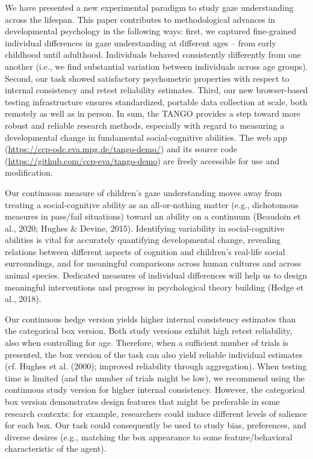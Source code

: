 \documentclass[
  man,floatsintext]{apa7}
\begin{document}
We have presented a new experimental paradigm to study gaze understanding across the lifespan.
This paper contributes to methodological advances in developmental psychology in the following ways: first, we captured fine-grained individual differences in gaze understanding at different ages -- from early childhood until adulthood.
Individuals behaved consistently differently from one another (i.e., we find substantial variation between individuals across age groups).
Second, our task showed satisfactory psychometric properties with respect to internal consistency and retest reliability estimates.
Third, our new browser-based testing infrastructure ensures standardized, portable data collection at scale, both remotely as well as in person.
In sum, the TANGO provides a step toward more robust and reliable research methods, especially with regard to measuring a developmental change in fundamental social-cognitive abilities.
The web app (\url{https://ccp-odc.eva.mpg.de/tango-demo/}) and its source code (\url{https://github.com/ccp-eva/tango-demo}) are freely accessible for use and modification.

Our continuous measure of children's gaze understanding moves away from treating a social-cognitive ability as an all-or-nothing matter (e.g., dichotomous measures in pass/fail situations) toward an ability on a continuum (Beaudoin et al., 2020; Hughes \& Devine, 2015).
Identifying variability in social-cognitive abilities is vital for accurately quantifying developmental change, revealing relations between different aspects of cognition and children's real-life social surroundings, and for meaningful comparisons across human cultures and across animal species.
Dedicated measures of individual differences will help us to design meaningful interventions and progress in psychological theory building (Hedge et al., 2018).

Our continuous hedge version yields higher internal consistency estimates than the categorical box version.
Both study versions exhibit high retest reliability, also when controlling for age.
Therefore, when a sufficient number of trials is presented, the box version of the task can also yield reliable individual estimates (cf. Hughes et al. (2000); improved reliability through aggregation).
When testing time is limited (and the number of trials might be low), we recommend using the continuous study version for higher internal consistency.
However, the categorical box version demonstrates design features that might be preferable in some research contexts: for example, researchers could induce different levels of salience for each box.
Our task could consequently be used to study bias, preferences, and diverse desires (e.g., matching the box appearance to some feature/behavioral characteristic of the agent).
\end{document}
